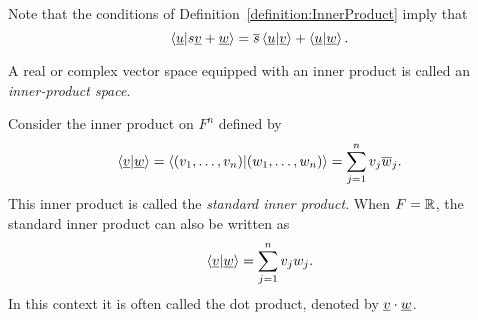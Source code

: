 Note that the conditions of Definition~\ref{definition:InnerProduct} imply that
\begin{equation*}
\left\langle \underline{u} | s \underline{v} + \underline{w} \right\rangle
= \overline{s} \left\langle \underline{u} | \underline{v} \right\rangle
+ \left\langle \underline{u} | \underline{w} \right\rangle .
\end{equation*}

\begin{definition}
A real or complex vector space equipped with an inner product is called an \emph{inner-product space}.
\end{definition}

\begin{example} \label{example:StandardInnerProduct}
Consider the inner product on $F^n$ defined by
\begin{equation*}
\left\langle \underline{v} | \underline{w} \right\rangle
= \left\langle (v_1, \ldots, v_n) | (w_1, \ldots, w_n) \right\rangle
= \sum_{j=1}^n v_j \overline{w}_j.
\end{equation*}
This inner product is called the \emph{standard inner product}.
When $F = \mathbb{R}$, the standard inner product can also be written as
\begin{equation*}
\left\langle \underline{v} | \underline{w} \right\rangle
= \sum_{j=1}^n v_j w_j.
\end{equation*}
In this context it is often called the dot product, denoted by $\underline{v} \cdot \underline{w}$.
\end{example}


